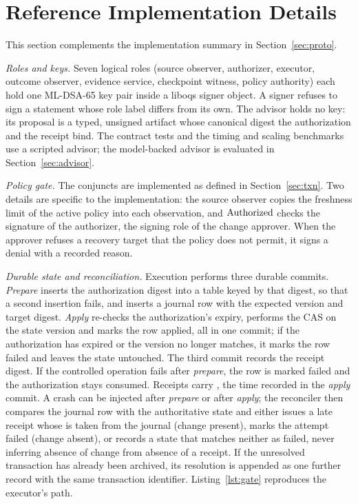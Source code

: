 \section{Reference Implementation Details}
\label{s:impl}
This section complements the implementation summary in Section~\ref{sec:proto}.

\emph{Roles and keys.} Seven logical roles (source observer, authorizer, executor, outcome observer, evidence service, checkpoint witness, policy authority) each hold one ML-DSA-65 key pair inside a liboqs signer object. A signer refuses to sign a statement whose role label differs from its own. The advisor holds no key: its proposal is a typed, unsigned artifact whose canonical digest the authorization and the receipt bind. The contract tests and the timing and scaling benchmarks use a scripted advisor; the model-backed advisor is evaluated in Section~\ref{sec:advisor}.

\emph{Policy gate.} The conjuncts are implemented as defined in Section~\ref{sec:txn}. Two details are specific to the implementation: the source observer copies the freshness limit of the active policy into each observation, and $\mathrm{Authorized}$ checks the signature of the authorizer, the signing role of the change approver. When the approver refuses a recovery target that the policy does not permit, it signs a denial with a recorded reason.

\emph{Durable state and reconciliation.} Execution performs three durable commits. \emph{Prepare} inserts the authorization digest into a table keyed by that digest, so that a second insertion fails, and inserts a journal row with the expected version and target digest. \emph{Apply} re-checks the authorization's expiry, performs the CAS on the state version and marks the row applied, all in one commit; if the authorization has expired or the version no longer matches, it marks the row failed and leaves the state untouched. The third commit records the receipt digest. If the controlled operation fails after \emph{prepare}, the row is marked failed and the authorization stays consumed. Receipts carry , the time recorded in the \emph{apply} commit. A crash can be injected after \emph{prepare} or after \emph{apply}; the reconciler then compares the journal row with the authoritative state and either issues a late receipt whose  is taken from the journal (change present), marks the attempt failed (change absent), or records a state that matches neither as failed, never inferring absence of change from absence of a receipt. If the unresolved transaction has already been archived, its resolution is appended as one further record with the same transaction identifier. Listing~\ref{lst:gate} reproduces the executor's path.

